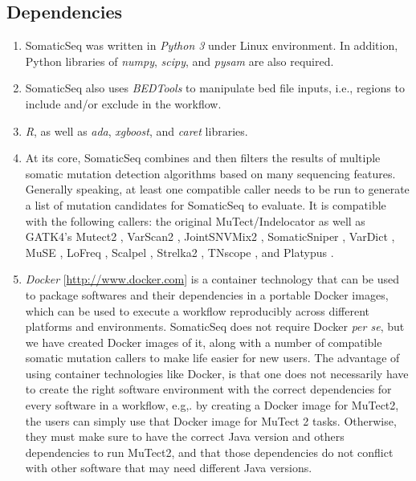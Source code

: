 \documentclass[10pt,letterpaper]{article}
\begin{document}
\begin{sloppypar}
\subsection{Dependencies}

\begin{enumerate}

    \item
    SomaticSeq was written in \emph{Python 3} under Linux environment. In addition, Python libraries of \emph{numpy}, \emph{scipy}, and \emph{pysam} are also required. 

    \item
    SomaticSeq also uses \emph{BEDTools} \cite{bedtools} to manipulate bed file inputs, i.e., regions to include and/or exclude in the workflow. 

    \item
    \emph{R}, as well as \emph{ada}, \emph{xgboost}, and \emph{caret} libraries. 

    \item
    At its core, SomaticSeq combines and then filters the results of multiple somatic mutation detection algorithms based on many sequencing features. Generally speaking, at least one compatible caller needs to be run to generate a list of mutation candidates for SomaticSeq to evaluate. It is compatible with the following callers: the original MuTect/Indelocator as well as GATK4's Mutect2 \cite{mutect}, VarScan2 \cite{varscan2}, JointSNVMix2 \cite{jointsnvmix2}, SomaticSniper \cite{somaticsniper}, VarDict \cite{vardict}, MuSE \cite{muse}, LoFreq \cite{lofreq}, Scalpel \cite{scalpel}, Strelka2 \cite{strelka2}, TNscope \cite{tnscope}, and Platypus \cite{platypus}.  
    
    \item
    \emph{Docker} [\href{http://www.docker.com}{http://www.docker.com}] is a container technology that can be used to package softwares and their dependencies in a portable Docker images, which can be used to execute a workflow reproducibly across different platforms and environments. SomaticSeq does not require Docker \textit{per se}, but we have created Docker images of it, along with a number of compatible somatic mutation callers to make life easier for new users. The advantage of using container technologies like Docker, is that one does not necessarily have to create the right software environment with the correct dependencies for every software in a workflow, e.g,. by creating a Docker image for MuTect2, the users can simply use that Docker image for MuTect 2 tasks. Otherwise, they must make sure to have the correct Java version and others dependencies to run MuTect2, and that those dependencies do not conflict with other software that may need different Java versions. 


\end{enumerate}
\end{sloppypar}
\end{document}
